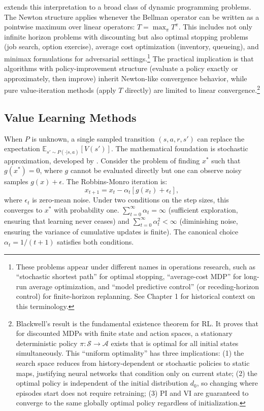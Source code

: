 \citet{bertsekas2022newton} extends this interpretation to a broad class of dynamic programming problems. The Newton structure applies whenever the Bellman operator can be written as a pointwise maximum over linear operators: $T = \max_\pi T^\pi$. This includes not only infinite horizon problems with discounting but also optimal stopping problems (job search, option exercise), average cost optimization (inventory, queueing), and minimax formulations for adversarial settings.\footnote{These problems appear under different names in operations research, such as ``stochastic shortest path'' for optimal stopping, ``average-cost MDP'' for long-run average optimization, and ``model predictive control'' (or receding-horizon control) for finite-horizon replanning. See Chapter 1 for historical context on this terminology.} The practical implication is that algorithms with policy-improvement structure (evaluate a policy exactly or approximately, then improve) inherit Newton-like convergence behavior, while pure value-iteration methods (apply $T$ directly) are limited to linear convergence.\footnote{Blackwell's result \citep{blackwell1965} is the fundamental existence theorem for RL. It proves that for discounted MDPs with finite state and action spaces, a stationary deterministic policy $\pi: \mathcal{S} \to \mathcal{A}$ exists that is optimal for all initial states simultaneously. This ``uniform optimality'' has three implications: (1) the search space reduces from history-dependent or stochastic policies to static maps, justifying neural networks that condition only on current state; (2) the optimal policy is independent of the initial distribution $d_0$, so changing where episodes start does not require retraining; (3) PI and VI are guaranteed to converge to the same globally optimal policy regardless of initialization.}


\subsection{Value Learning Methods}
\label{sec:stochastic_approx}

When $P$ is unknown, a single sampled transition $(s, a, r, s')$ can replace the expectation $\mathbb{E}_{s' \sim P(\cdot|s,a)}[V(s')]$. The mathematical foundation is stochastic approximation, developed by \citet{Robbins1952}. Consider the problem of finding $x^*$ such that $g(x^*) = 0$, where $g$ cannot be evaluated directly but one can observe noisy samples $g(x) + \epsilon$. The Robbins-Monro iteration is:
\begin{equation}
x_{t+1} = x_t - \alpha_t [g(x_t) + \epsilon_t],
\label{eq:robbins_monro}
\end{equation}
where $\epsilon_t$ is zero-mean noise. Under two conditions on the step sizes, this converges to $x^*$ with probability one. $\sum_{t=0}^\infty \alpha_t = \infty$ (sufficient exploration, ensuring that learning never ceases) and $\sum_{t=0}^\infty \alpha_t^2 < \infty$ (diminishing noise, ensuring the variance of cumulative updates is finite). The canonical choice $\alpha_t = 1/(t+1)$ satisfies both conditions.

